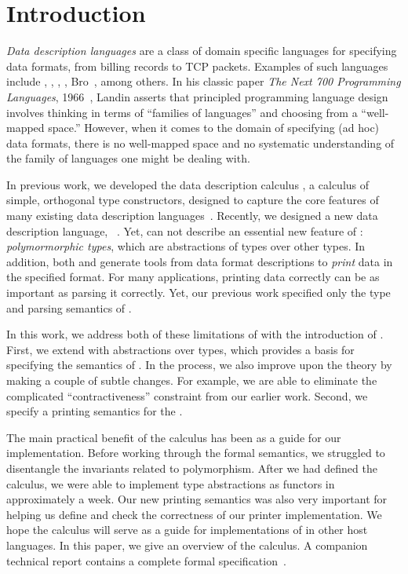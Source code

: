 \section{Introduction}
\label{sec:intro}

{\em Data description languages} are a class of domain specific
languages for specifying data formats, from billing records to TCP
packets.  Examples of such languages include \datascript{},
\packettypes{}, \padsc{}, \padsml{},
Bro~\cite{gpce02,sigcomm00,fisher+:pads,mandelbaum+:padsml,paxson:bro},
among others.  In his classic paper {\em The Next 700 Programming
  Languages}, 1966~\cite{landin:700}, Landin asserts that principled
programming language design involves thinking in terms of ``families
of languages'' and choosing from a ``well-mapped space.''  However,
when it comes to the domain of specifying (ad hoc) data formats, there
is no well-mapped space and no systematic understanding of the family
of languages one might be dealing with.

In previous work, we developed the data description calculus
\ddcold{}, a calculus of simple, orthogonal type constructors,
designed to capture the core features of many existing data
description languages~\cite{fisher+:next700ddl}. Recently, we designed
a new data description language,
\padsml{}~\cite{mandelbaum+:padsml}. Yet, \ddcold{} can not describe
an essential new feature of \padsml{}: {\em polymormorphic types},
which are abstractions of types over other types.  In addition, both
\padsc{} and \padsml{} generate tools from data format descriptions to
{\em print} data in the specified format. For many applications,
printing data correctly can be as important as parsing it
correctly. Yet, our previous work specified only the type and parsing
semantics of \ddcold{}.

In this work, we address both of these limitations of \ddcold{} with
the introduction of \ddc{}. First, we extend \ddcold{} with
abstractions over types, which provides a basis for specifying the
semantics of \padsml{}. In the process, we also improve upon the
\ddcold{} theory by making a couple of subtle changes. For example, we
are able to eliminate the complicated ``contractiveness'' constraint
from our earlier work. Second, we specify a printing semantics for the
\ddc{}.

The main practical benefit of the calculus has been as a guide for our
implementation. Before working through the formal semantics, we
struggled to disentangle the invariants related to polymorphism. After
we had defined the calculus, we were able to implement type
abstractions as \ocaml{} functors in approximately a week.  Our new
printing semantics was also very important for helping us define and
check the correctness of our printer implementation.  We hope the
calculus will serve as a guide for implementations of \pads{} in
other host languages.  In this paper, we give an overview of the
calculus.  A companion technical report contains a complete formal
specification~\cite{fisher+:popl-sub-long}.

